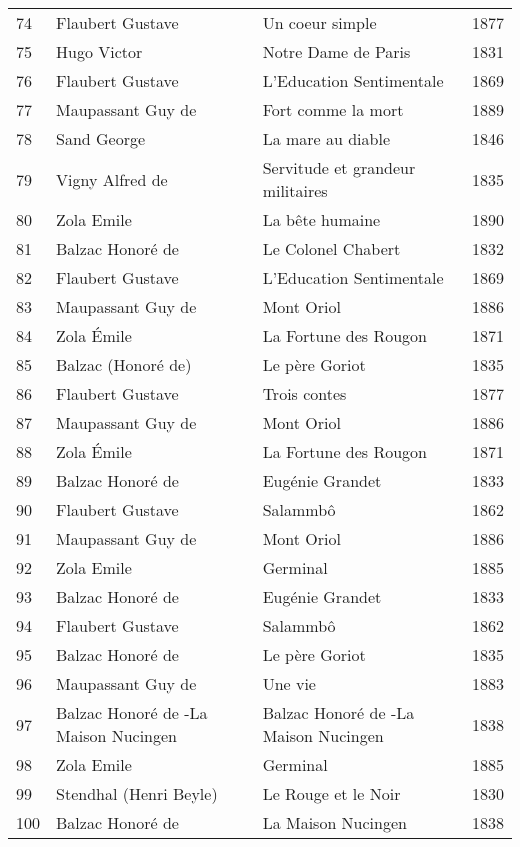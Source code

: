 \begin{table}
\begin{tabular}{l l l l}
    74 & Flaubert Gustave & Un coeur simple & 1877 \\
    75 & Hugo Victor & Notre Dame de Paris & 1831 \\
    76 & Flaubert Gustave & L'Education Sentimentale & 1869 \\
    77 & Maupassant Guy de & Fort comme la mort & 1889 \\
    78 & Sand George & La mare au diable & 1846 \\
    79 & Vigny Alfred de & Servitude et grandeur militaires & 1835 \\
    80 & Zola Emile & La bête humaine & 1890 \\
    81 & Balzac Honoré de & Le Colonel Chabert & 1832 \\
    82 & Flaubert Gustave & L'Education Sentimentale & 1869 \\
    83 & Maupassant Guy de & Mont Oriol & 1886 \\
    84 & Zola Émile & La Fortune des Rougon & 1871 \\
    85 & Balzac (Honoré de) & Le père Goriot & 1835 \\
    86 & Flaubert Gustave & Trois contes & 1877 \\
    87 & Maupassant Guy de & Mont Oriol & 1886 \\
    88 & Zola Émile & La Fortune des Rougon & 1871 \\
    89 & Balzac Honoré de & Eugénie Grandet & 1833 \\
    90 & Flaubert Gustave & Salammbô & 1862 \\
    91 & Maupassant Guy de & Mont Oriol & 1886 \\
    92 & Zola Emile & Germinal & 1885 \\
    93 & Balzac Honoré de & Eugénie Grandet & 1833 \\
    94 & Flaubert Gustave & Salammbô & 1862 \\
    95 & Balzac Honoré de & Le père Goriot & 1835 \\
    96 & Maupassant Guy de & Une vie & 1883 \\
    97 & Balzac Honoré de -La Maison Nucingen & Balzac Honoré de -La Maison Nucingen & 1838 \\
    98 & Zola Emile & Germinal & 1885 \\
    99 & Stendhal (Henri Beyle) & Le Rouge et le Noir & 1830 \\
    100 & Balzac Honoré de & La Maison Nucingen & 1838 \\
    \bottomrule
  \end{tabular}
\end{table}

